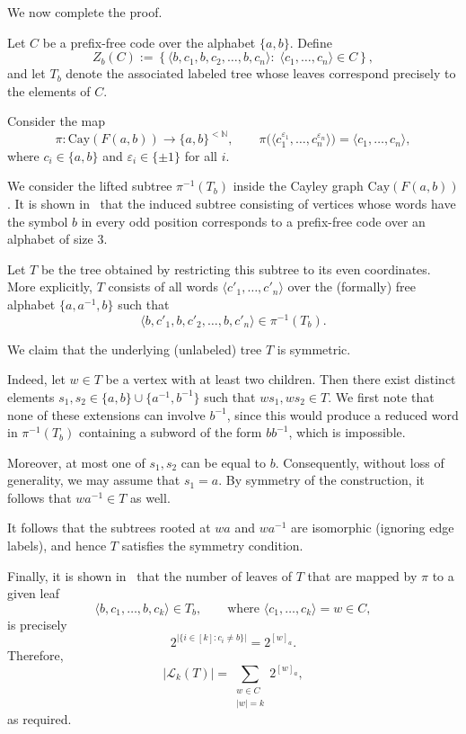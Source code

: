 \documentclass[a4,12pt]{article}%
\begin{document}
We now complete the proof.

\medskip

Let $C$ be a prefix-free code over the alphabet $\{a,b\}$. Define
\[
Z_b(C)
:=
\left\{
\langle b, c_1, b, c_2, \dots, b, c_n \rangle
:\;
\langle c_1,\dots,c_n \rangle \in C
\right\},
\]
and let $T_b$ denote the associated labeled tree whose leaves correspond precisely to the elements of $C$.

\medskip

Consider the map
\[
\pi \colon \mathrm{Cay}(F(a,b)) \to \{a,b\}^{<\mathbb{N}},
\qquad
\pi\big(\langle c_1^{\varepsilon_1}, \dots, c_n^{\varepsilon_n} \rangle\big)
=
\langle c_1, \dots, c_n \rangle,
\]
where $c_i \in \{a,b\}$ and $\varepsilon_i \in \{\pm 1\}$ for all $i$.

\medskip

We consider the lifted subtree $\pi^{-1}(T_b)$ inside the Cayley graph $\mathrm{Cay}(F(a,b))$. It is shown in~\cite{PrefixCodesandFreeGroups} that the induced subtree consisting of vertices whose words have the symbol $b$ in every odd position corresponds to a prefix-free code over an alphabet of size $3$.

Let $T$ be the tree obtained by restricting this subtree to its even coordinates. More explicitly, $T$ consists of all words $\langle c'_1, \dots, c'_n \rangle$ over the (formally) free alphabet $\{a,a^{-1},b\}$ such that
\[
\langle b, c'_1, b, c'_2, \dots, b, c'_n \rangle
\in \pi^{-1}(T_b).
\]

\medskip

We claim that the underlying (unlabeled) tree $T$ is symmetric.

Indeed, let $w \in T$ be a vertex with at least two children. Then there exist distinct elements $s_1, s_2 \in \{a,b\} \cup \{a^{-1}, b^{-1}\}$ such that $ws_1, ws_2 \in T$. We first note that none of these extensions can involve $b^{-1}$, since this would produce a reduced word in $\pi^{-1}(T_b)$ containing a subword of the form $bb^{-1}$, which is impossible.

Moreover, at most one of $s_1, s_2$ can be equal to $b$. Consequently, without loss of generality, we may assume that $s_1 = a$. By symmetry of the construction, it follows that $wa^{-1} \in T$ as well. 

It follows that the subtrees rooted at $wa$ and $wa^{-1}$ are isomorphic (ignoring edge labels), and hence $T$ satisfies the symmetry condition.

\medskip

Finally, it is shown in~\cite{PrefixCodesandFreeGroups} that the number of leaves of $T$ that are mapped by $\pi$ to a given leaf
\[
\langle b, c_1, \dots, b, c_k \rangle \in T_b,
\qquad
\text{where } \langle c_1,\dots,c_k \rangle = w \in C,
\]
is precisely
\[
2^{\lvert \{ i \in [k] : c_i \neq b \} \rvert}
=
2^{[w]_a}.
\]
Therefore,
\[
\lvert \mathcal{L}_k(T) \rvert
=
\sum_{\substack{w \in C \\ \lvert w \rvert = k}} 2^{[w]_a},
\]
as required.
\end{document}
